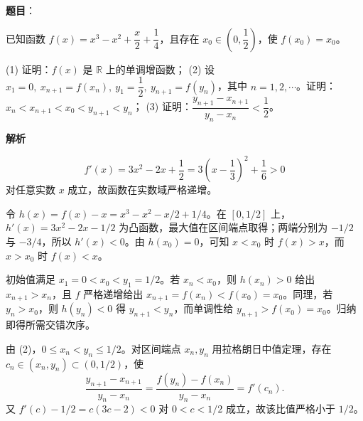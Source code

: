 \begin{answer}

\textbf{题目}：

已知函数 \(f(x)=x^3-x^2+\dfrac x2+\dfrac14\)，且存在 \(x_0\in\left(0,\dfrac12\right)\)，使 \(f(x_0)=x_0\)。

(1) 证明：\(f(x)\) 是 \(\mathbb R\) 上的单调增函数；
(2) 设 \(x_1=0,\ x_{n+1}=f(x_n),\ y_1=\dfrac12,\ y_{n+1}=f(y_n)\)，其中 \(n=1,2,\cdots\)。证明：\(x_n<x_{n+1}<x_0<y_{n+1}<y_n\)；
(3) 证明：\(\dfrac{y_{n+1}-x_{n+1}}{y_n-x_n}<\dfrac12\)。

\textbf{解析}


\nopagebreak[4]
\[
f'(x)=3x^2-2x+\frac12
=3\left(x-\frac13\right)^2+\frac16>0
\]
对任意实数 \(x\) 成立，故函数在实数域严格递增。


令 \(h(x)=f(x)-x=x^3-x^2-x/2+1/4\)。在 \([0,1/2]\) 上，\(h'(x)=3x^2-2x-1/2\) 为凸函数，最大值在区间端点取得；两端分别为 \(-1/2\) 与 \(-3/4\)，所以 \(h'(x)<0\)。由 \(h(x_0)=0\)，可知 \(x<x_0\) 时 \(f(x)>x\)，而 \(x>x_0\) 时 \(f(x)<x\)。

初始值满足 \(x_1=0<x_0<y_1=1/2\)。若 \(x_n<x_0\)，则 \(h(x_n)>0\) 给出 \(x_{n+1}>x_n\)，且 \(f\) 严格递增给出 \(x_{n+1}=f(x_n)<f(x_0)=x_0\)。同理，若 \(y_n>x_0\)，则 \(h(y_n)<0\) 得 \(y_{n+1}<y_n\)，而单调性给 \(y_{n+1}>f(x_0)=x_0\)。归纳即得所需交错次序。


由 (2)，\(0\le x_n<y_n\le1/2\)。对区间端点 \(x_n,y_n\) 用拉格朗日中值定理，存在 \(c_n\in(x_n,y_n)\subset(0,1/2)\)，使
\nopagebreak[4]
\[
\frac{y_{n+1}-x_{n+1}}{y_n-x_n}
=\frac{f(y_n)-f(x_n)}{y_n-x_n}=f'(c_n).
\]
又 \(f'(c)-1/2=c(3c-2)<0\) 对 \(0<c<1/2\) 成立，故该比值严格小于 \(1/2\)。




\end{answer}